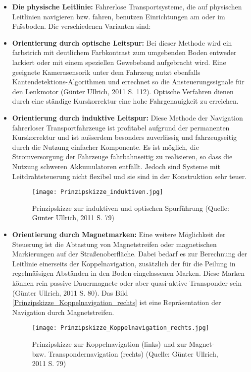 \begin{itemize}
	\item \textbf{Die physische Leitlinie:}  Fahrerlose Transportsysteme, die auf physischen Leitlinien navigieren bzw. fahren, benutzen Einrichtungen am oder im Fu\"ssboden. Die verschiedenen Varianten sind:
 \item \textbf{Orientierung durch optische Leitspur:} Bei dieser Methode wird ein farbstrich mit deutlichem Farbkontrast zum umgebenden Boden entweder lackiert oder mit einem speziellen Gewebeband aufgebracht wird. Eine geeignete Kamerasensorik unter dem Fahrzeug nutzt ebenfalls Kantendetektions-Algorithmen  und errechnet so die Ansteuerungssignale f\"ur den Lenkmotor (G\"unter Ullrich, 2011 S. 112). Optische Verfahren dienen durch eine st\"andige Kurskorrektur eine hohe  Fahrgenauigkeit zu erreichen. 
\item \textbf{Orientierung durch induktive Leitspur:} Diese Methode der Navigation fahrerloser Transportfahrzeuge ist profitabel aufgrund der permanenten Kurskorrektur und ist au\"sserdem besonders zuverl\"assig und fahrzeugseitig durch die Nutzung einfacher Komponente. Es ist m\"oglich, die Stromversorgung der Fahrzeuge fahrbahnseitig zu realisieren, so dass die Nutzung schweren Akkumulatoren entf\"allt. Jedoch sind Systeme mit Leitdrahtsteuerung nicht flexibel und sie sind in der Konstruktion sehr teuer.
\begin{figure}[h!]
	\centering
		\texttt{[image: Prinzipskizze\_induktiven.jpg]}
	\caption{Prinzipskizze zur induktiven und optischen Spurf\"uhrung (Quelle: G\"unter Ullrich, 2011 S. 79)}
	\label{Prinzipskizze_induktiven}
\end{figure}  
	\item \textbf{Orientierung durch Magnetmarken:} Eine weitere M\"oglichkeit der Steuerung ist die Abtastung von Magnetstreifen oder magnetischen Markierungen auf der Straßenoberfl\"ache. Dabei bedarf es zur Berechnung der Leitlinie einerseits der Koppelnavigation, zus\"atzlich der f\"ur die Peilung in regelm\"a\"ssigen Abst\"anden in den Boden eingelassenen Marken. Diese Marken k\"onnen rein passive Dauermagnete oder aber quasi-aktive Transponder sein (G\"unter Ullrich, 2011 S. 80). Das Bild \ref{Prinzipskizze_Koppelnavigation_rechts} ist eine Repr\"asentation der Navigation durch Magnetstreifen.
	\begin{figure}[h!]
		\centering
			\texttt{[image: Prinzipskizze\_Koppelnavigation\_rechts.jpg]}
			\caption{Prinzipskizze zur Koppelnavigation (links) und zur Magnet- bzw. Transpondernavigation (rechts) (Quelle: G\"unter Ullrich, 2011 S. 79)}

\end{figure}
\end{itemize}
